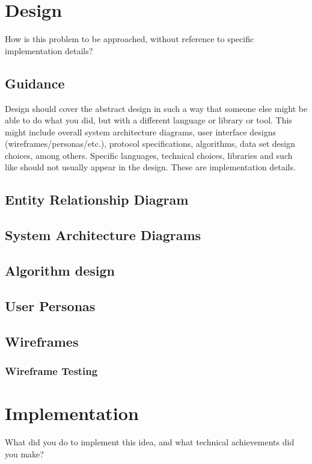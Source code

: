 \documentclass{l4proj}
\begin{document}
\chapter{Design}
How is this problem to be approached, without reference to specific implementation details? 
\section{Guidance}
Design should cover the abstract design in such a way that someone else might be able to do what you did, 
but with a different language or library or tool. This might include overall system architecture diagrams,
user interface designs (wireframes/personas/etc.), protocol specifications, algorithms, data set design choices,
among others. Specific languages, technical choices, libraries and such like should not usually appear in the design. These are implementation details.

\section{Entity Relationship Diagram}
\section{System Architecture Diagrams}
\section{Algorithm design}
\section{User Personas}
\section{Wireframes}
\subsection{Wireframe Testing}




\chapter{Implementation}
What did you do to implement this idea, and what technical achievements did you make?
\end{document}
